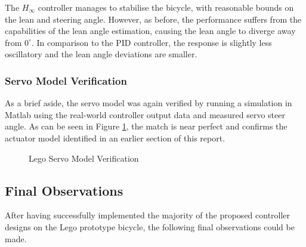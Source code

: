 The $H_{\infty}$ controller manages to stabilise the bicycle, with reasonable bounds on the lean and steering angle. However, as before, the performance suffers from the capabilities of the lean angle estimation, causing the lean angle to diverge away from $0^{\circ}$. In comparison to the PID controller, the response is slightly less oscillatory and the lean angle deviations are smaller.

\subsubsection{Servo Model Verification}
As a brief aside, the servo model was again verified by running a simulation in Matlab using the real-world controller output data and measured servo steer angle. As can be seen in Figure \ref{fig:LegoServoIDPart2}, the match is near perfect and confirms the actuator model identified in an earlier section of this report. \\

\begin{figure}[H]
\centering
{}
	\caption{Lego Servo Model Verification}
	\label{fig:LegoServoIDPart2}
\end{figure}

\subsection{Final Observations}
After having successfully implemented the majority of the proposed controller designs on the Lego prototype bicycle, the following final observations could be made.

